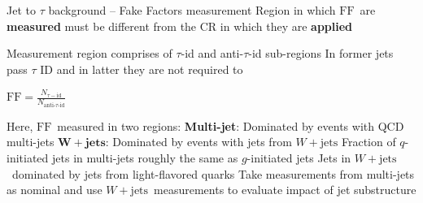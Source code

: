 \documentclass[10pt]{beamer}
\newcommand*{\Wjets}{\ensuremath{W+\text{jets}}}
\newcommand*{\FF}{\ensuremath{\text{FF}}}
\begin{document}
\begin{frame}{Jet to $\tau$ background -- Fake Factors measurement}
\centering
Region in which \FF\ are {\bf measured} must be different from the CR in which they are {\bf applied}
\begin{outline}
\1 Measurement region comprises of $\tau$-id and anti-$\tau$-id sub-regions
	\2 In former jets pass $\tau$ ID and in latter they are not required to 
\end{outline}

\begin{tcolorbox}[width=\linewidth, colback=white,colframe=red,nobeforeafter,tcbox raise base,top=0pt,left=0pt,right=0pt,bottom=0pt]
\centering
$\FF = \frac{N_{\tau-\text{id}}}{N_{\text{anti-}\tau\text{-id}}}$ 
\end{tcolorbox}

\begin{outline}
\1 Here, \FF\ measured in two regions:
	\2 {\bf Multi-jet}: Dominated by events with QCD multi-jets
	\2 $\boldsymbol{\Wjets}$: Dominated by events with jets from \Wjets 
\1 Fraction of $q$-initiated jets in multi-jets roughly the same as $g$-initiated jets
\1 Jets in \Wjets\ dominated by jets from light-flavored quarks
\1 Take measurements from multi-jets as nominal and use \Wjets\ measurements to evaluate 
impact of jet substructure
\end{outline}

\end{frame}
\end{document}
